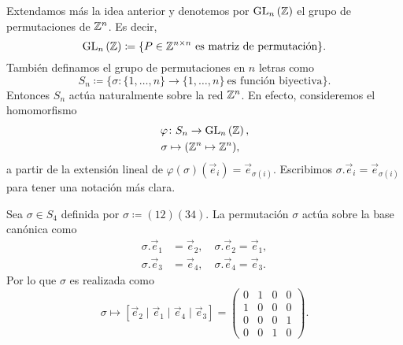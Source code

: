 Extendamos más la idea anterior y denotemos por $\operatorname{GL}_{n}\left(\mathbb{Z}\right)$ el grupo de permutaciones de $\mathbb{Z}^n$.
Es decir,
\begin{equation*}
	\operatorname{GL}_{n}\left(\mathbb{Z}\right) \coloneq \lbrace P \in \mathbb{Z}^{n \times n} ~\text{es matriz de
	permutación} \rbrace.
\end{equation*}
También definamos el grupo de permutaciones en $n$ letras como
\begin{equation*}
	S_n \coloneq \lbrace \sigma \colon \lbrace 1, \ldots, n \rbrace \to \lbrace
	1, \ldots, n \rbrace ~\text{es función biyectiva} \rbrace.
\end{equation*}
Entonces $S_n$ actúa naturalmente sobre la red $\mathbb{Z}^n$. En efecto, consideremos el homomorfismo
\begin{align*}
	\varphi &\colon S_n \to \operatorname{GL}_{n}\left(\mathbb{Z}\right),\\
	\sigma &\mapsto (\mathbb{Z}^n \mapsto \mathbb{Z}^n),
\end{align*}
a partir de la extensión lineal de $\varphi(\sigma)(\vec{e}_i) = \vec{e}_{\sigma(i)}$. Escribimos
$\sigma.\vec{e}_i = \vec{e}_{\sigma(i)}$ para tener una notación más clara.
\begin{example}
	Sea $\sigma \in S_4$ definida por $\sigma \coloneq (12)(34)$. La permutación $\sigma$ actúa
	sobre la base canónica como
	\begin{align*}
		\sigma.\vec{e}_1 &= \vec{e}_2, \quad \sigma.\vec{e}_2 = \vec{e}_1, \\
		\sigma.\vec{e}_3 &= \vec{e}_4, \quad \sigma.\vec{e}_4 = \vec{e}_3.
	\end{align*}
	Por lo que $\sigma$ es realizada como
	\begin{equation*}
		\sigma \mapsto [\vec{e}_2 \mid \vec{e}_1 \mid \vec{e}_4 \mid \vec{e}_3]
		= \begin{pmatrix}
			0 & 1 & 0 & 0 \\
			1 & 0 & 0 & 0 \\
			0 & 0 & 0 & 1 \\
			0 & 0 & 1 & 0
		\end{pmatrix}.
	\end{equation*}
\end{example}

